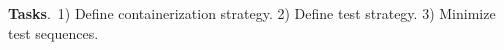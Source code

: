 \documentclass[11pt]{article}
\begin{document}


\newcommand{\taskvirtualization}{1}
\newcommand{\taskteststrategies}{2}
\newcommand{\idminimization}{3}

\vspace{1ex}\noindent\textbf{Tasks}.~\taskvirtualization{}) Define
containerization strategy. \taskteststrategies{}) Define test
strategy. \idminimization{}) Minimize test sequences.



\end{document}

